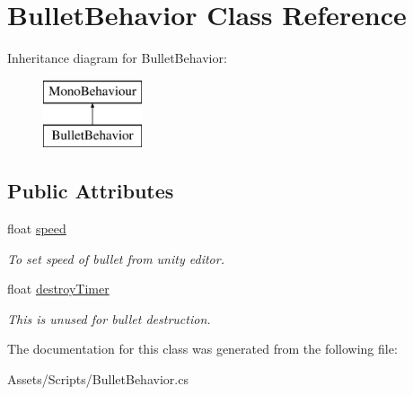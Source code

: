 \hypertarget{class_bullet_behavior}{}\section{Bullet\+Behavior Class Reference}
\label{class_bullet_behavior}
Inheritance diagram for Bullet\+Behavior\+:\begin{figure}[H]
\begin{center}
\leavevmode
\includegraphics[height=2.000000cm]{class_bullet_behavior}
\end{center}
\end{figure}
\subsection*{Public Attributes}
\begin{DoxyCompactItemize}
\item 
\mbox{\label{class_bullet_behavior_a96bc765df5aeef30e70dc9f37f262085}} 
float \mbox{\hyperlink{class_bullet_behavior_a96bc765df5aeef30e70dc9f37f262085}{speed}}
\begin{DoxyCompactList}\small\item\em To set speed of bullet from unity editor. \end{DoxyCompactList}\item 
\mbox{\label{class_bullet_behavior_adb2cef52a17afe7fa373d944e87a15d3}} 
float \mbox{\hyperlink{class_bullet_behavior_adb2cef52a17afe7fa373d944e87a15d3}{destroy\+Timer}}
\begin{DoxyCompactList}\small\item\em This is unused for bullet destruction. \end{DoxyCompactList}\end{DoxyCompactItemize}


The documentation for this class was generated from the following file\+:\begin{DoxyCompactItemize}
\item 
Assets/\+Scripts/Bullet\+Behavior.\+cs\end{DoxyCompactItemize}
